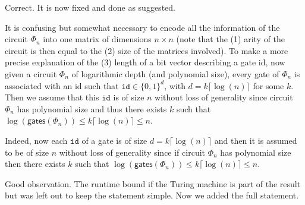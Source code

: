 \answer Correct. It is now fixed and done as suggested.
\bigskip

\begin{comment}
	Algorithm 1: Also, please note that you overload $n$ with many different meanings:
	(1) arity of the circuit, (2) size of the matrices, and (3) length of a bit vector describing a gate id.
\end{comment}

\answer It is confusing but somewhat necessary to encode all the information of the circuit $\Phi_n$ into one
matrix of dimensions $n\times n$ (note that the (1) arity of the circuit is then equal to the (2) size of the matrices involved).
To make a more precise explanation of the (3) length of a bit vector describing a gate id,
now given a circuit $\Phi_n$ of logarithmic depth
(and polynomial size), every gate of $\Phi_n$ is associated with an id
such that $\texttt{id}\in\lbrace 0,1 \rbrace^{d}$, with $d=k\lceil\log(n)\rceil$ for some $k$.
Then we assume that this $\texttt{id}$ is of size $n$ without loss of generality since circuit $\Phi_n$ has polynomial size and thus there exists $k$ such that
$\log(\mathsf{gates}(\Phi_n)) \leq k\lceil\log(n)\rceil\leq n$.
\bigskip
{}


\begin{comment}
	Algorithm 1: Why are gate ids of linear length in the input? This would correspond to an
	circuit of exponential size.
\end{comment}

\answer Indeed, now each $\texttt{id}$ of a gate is of size $d=k\lceil\log(n)\rceil$ and then it is assumed to be of size $n$ without loss of generality
since if circuit $\Phi_n$ has polynomial size then there exists $k$ such that
$\log(\mathsf{gates}(\Phi_n)) \leq k\lceil\log(n)\rceil\leq n$.
\bigskip


\begin{comment}
	Proposition 5.2: First of all, add a runtime bound to the Turing machine. I do not believe that
	your construction can simulate every linear space machine without restrictions
	on the runtime.
\end{comment}

\answer Good observation. The runtime bound if the Turing machine is part of the result but was left out to keep the statement simple. Now we added the full statement.
\bigskip



